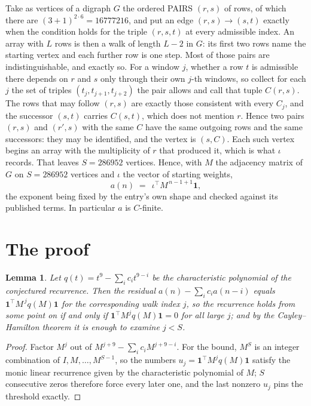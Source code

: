 \documentclass[11pt,a4paper]{article}
\theoremstyle{plain}
\newtheorem{lemma}[theorem]{Lemma}
\theoremstyle{definition}
\begin{document}
Take as vertices of a digraph $G$ the ordered PAIRS $(r,s)$ of rows, of which there are
$(3+1)^{2\cdot6}=16777216$, and put an edge $(r,s)\to(s,t)$ exactly when the condition
holds for the triple $(r,s,t)$ at every admissible index. An array with $L$ rows is then a
walk of length $L-2$ in $G$: its first two rows name the starting vertex and each further
row is one step. Most of those pairs are indistinguishable, and exactly so. For a window $j$, whether a row $t$ is admissible there depends on $r$ and $s$ only through their own $j$-th windows, so collect for each $j$ the set of triples $(t_j,t_{j+1},t_{j+2})$ the pair allows and call that tuple $C(r,s)$. The rows that may follow $(r,s)$ are exactly those consistent with every $C_j$, and the successor $(s,t)$ carries $C(s,t)$, which does not mention $r$. Hence two pairs $(r,s)$ and $(r',s)$ with the same $C$ have the same outgoing rows and the same successors: they may be identified, and the vertex is $(s,C)$. Each such vertex begins an array with the multiplicity of $r$ that produced it, which is what $\iota$ records. That leaves $S=286952$ vertices. Hence, with $M$ the adjacency matrix of $G$ on $S=286952$ vertices and
$\iota$ the vector of starting weights,
\[
a(n)\;=\;\,\iota^{\!\top}M^{\,n-1+1}\mathbf{1},
\]
the exponent being fixed by the entry's own shape and checked against its published terms.
In particular $a$ is $C$-finite.

\section{The proof}

\begin{lemma}\label{lem:crit}
Let $q(t)=t^{9}-\sum_i c_it^{9-i}$ be the characteristic polynomial of the
conjectured recurrence. Then the residual $a(n)-\sum_ic_ia(n-i)$ equals
$\mathbf{1}^{\!\top}M^{\,j}q(M)\mathbf{1}$ for the corresponding walk index
$j$, so the recurrence holds from some point on if and only if
$\mathbf{1}^{\!\top}M^{j}q(M)\mathbf{1}=0$ for all large $j$; and by the
Cayley--Hamilton theorem it is enough to examine $j<S$.
\end{lemma}

\begin{proof}
Factor $M^{j}$ out of $M^{j+9}-\sum_ic_iM^{j+9-i}$. For the bound, $M^{S}$
is an integer combination of $I,M,\dots,M^{S-1}$, so the numbers
$u_j=\mathbf{1}^{\!\top}M^{j}q(M)\mathbf{1}$ satisfy the monic linear recurrence given by
the characteristic polynomial of $M$; $S$ consecutive zeros therefore force every later one,
and the last nonzero $u_j$ pins the threshold exactly.
\end{proof}
\end{document}
